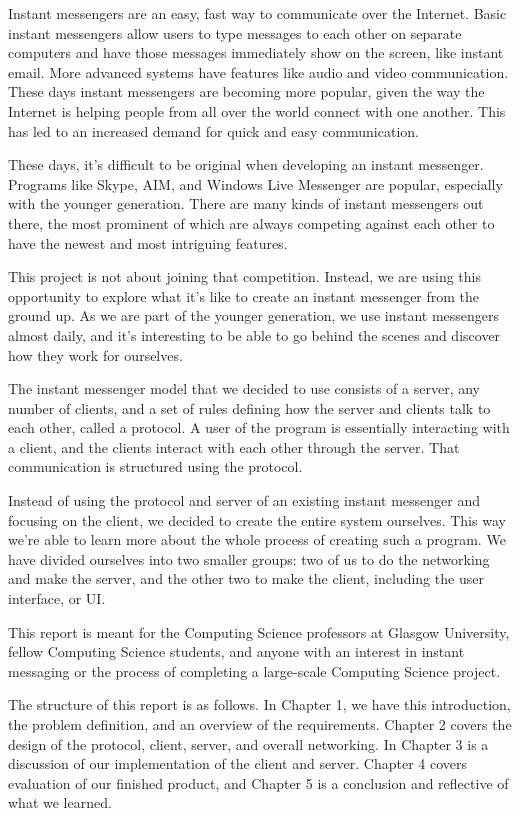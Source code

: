 Instant messengers are an easy, fast way to communicate over the Internet. Basic instant messengers allow users to type messages to each other on separate computers and have those messages immediately show on the screen, like instant email. More advanced systems have features like audio and video communication. These days instant messengers are becoming more popular, given the way the Internet is helping people from all over the world connect with one another. This has led to an increased demand for quick and easy communication.

These days, it's difficult to be original when developing an instant messenger. Programs like Skype, AIM, and Windows Live Messenger are popular, especially with the younger generation. There are many kinds of instant messengers out there, the most prominent of which are always competing against each other to have the newest and most intriguing features.

This project is not about joining that competition. Instead, we are using this opportunity to explore what it's like to create an instant messenger from the ground up. As we are part of the younger generation, we use instant messengers almost daily, and it's interesting to be able to go behind the scenes and discover how they work for ourselves.

The instant messenger model that we decided to use consists of a server, any number of clients, and a set of rules defining how the server and clients talk to each other, called a protocol. A user of the program is essentially interacting with a client, and the clients interact with each other through the server. That communication is structured using the protocol.

Instead of using the protocol and server of an existing instant messenger and focusing on the client, we decided to create the entire system ourselves. This way we're able to learn more about the whole process of creating such a program. We have divided ourselves into two smaller groups: two of us to do the networking and make the server, and the other two to make the client, including the user interface, or UI.

This report is meant for the Computing Science professors at Glasgow University, fellow Computing Science students, and anyone with an interest in instant messaging or the process of completing a large-scale Computing Science project.

The structure of this report is as follows. In Chapter 1, we have this introduction, the problem definition, and an overview of the requirements. Chapter 2 covers the design of the protocol, client, server, and overall networking. In Chapter 3 is a discussion of our implementation of the client and server. Chapter 4 covers evaluation of our finished product, and Chapter 5 is a conclusion and reflective of what we learned.
